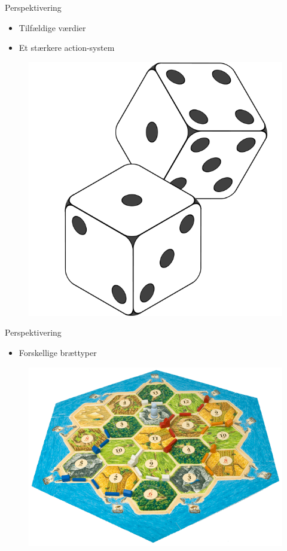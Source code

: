 \begin{frame}{Perspektivering}
  \vspace{0.5cm}
  \begin{itemize}
		\item Tilfældige værdier
		\vspace{0.1cm}
		\item Et stærkere action-system
	\end{itemize}
	\begin{figure}[H]
   			\includegraphics[scale=0.15]{billeder/2-Dice-Icon.png}
	\end{figure}	
\end{frame}

\begin{frame}{Perspektivering}
	\vspace{0.4cm}
	\begin{itemize}
		\item Forskellige brættyper
	\end{itemize}
	\begin{figure}[H]
   		\includegraphics[scale=0.3]{billeder/settlers-board2.png}
	\end{figure}	
\end{frame}